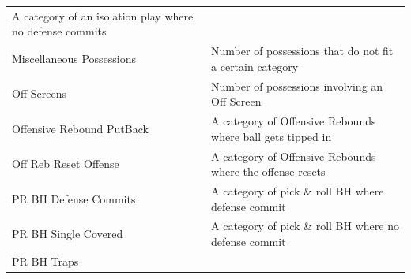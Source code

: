 \documentclass[]{book}
\begin{document}
\begin{longtable}[]{@{}ll@{}}
\begin{minipage}[t]{0.65\columnwidth}
A category of an isolation play where no defense commits\strut
\end{minipage}\tabularnewline
\begin{minipage}[t]{0.29\columnwidth}\raggedright
Miscellaneous Possessions\strut
\end{minipage} & \begin{minipage}[t]{0.65\columnwidth}\raggedright
Number of possessions that do not fit a certain category\strut
\end{minipage}\tabularnewline
\begin{minipage}[t]{0.29\columnwidth}\raggedright
Off Screens\strut
\end{minipage} & \begin{minipage}[t]{0.65\columnwidth}\raggedright
Number of possessions involving an Off Screen\strut
\end{minipage}\tabularnewline
\begin{minipage}[t]{0.29\columnwidth}\raggedright
Offensive Rebound PutBack\strut
\end{minipage} & \begin{minipage}[t]{0.65\columnwidth}\raggedright
A category of Offensive Rebounds where ball gets tipped in\strut
\end{minipage}\tabularnewline
\begin{minipage}[t]{0.29\columnwidth}\raggedright
Off Reb Reset Offense\strut
\end{minipage} & \begin{minipage}[t]{0.65\columnwidth}\raggedright
A category of Offensive Rebounds where the offense resets\strut
\end{minipage}\tabularnewline
\begin{minipage}[t]{0.29\columnwidth}\raggedright
PR BH Defense Commits\strut
\end{minipage} & \begin{minipage}[t]{0.65\columnwidth}\raggedright
A category of pick \& roll BH where defense commit\strut
\end{minipage}\tabularnewline
\begin{minipage}[t]{0.29\columnwidth}\raggedright
PR BH Single Covered\strut
\end{minipage} & \begin{minipage}[t]{0.65\columnwidth}\raggedright
A category of pick \& roll BH where no defense commit\strut
\end{minipage}\tabularnewline
\begin{minipage}[t]{0.29\columnwidth}\raggedright
PR BH Traps\strut

\end{minipage}
\end{longtable}
\end{document}
